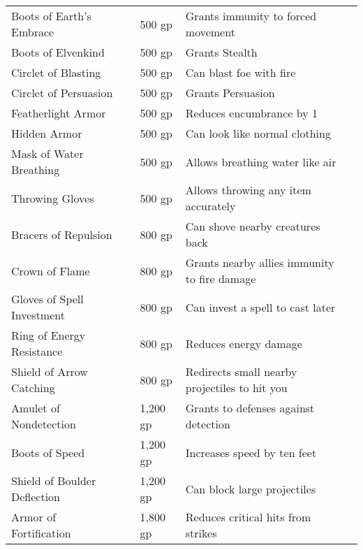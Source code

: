 \begin{longtabuwrapper}
\begin{longtabu}{l l l X l}
Boots of Earth's Embrace &  & 500 gp & Grants immunity to forced movement & \pageref{item:Boots of Earth's Embrace} \\
Boots of Elvenkind &  & 500 gp & Grants  Stealth & \pageref{item:Boots of Elvenkind} \\
Circlet of Blasting &  & 500 gp & Can blast foe with fire & \pageref{item:Circlet of Blasting} \\
Circlet of Persuasion &  & 500 gp & Grants  Persuasion & \pageref{item:Circlet of Persuasion} \\
Featherlight Armor &  & 500 gp & Reduces encumbrance by 1 & \pageref{item:Featherlight Armor} \\
Hidden Armor &  & 500 gp & Can look like normal clothing & \pageref{item:Hidden Armor} \\
Mask of Water Breathing &  & 500 gp & Allows breathing water like air & \pageref{item:Mask of Water Breathing} \\
Throwing Gloves &  & 500 gp & Allows throwing any item accurately & \pageref{item:Throwing Gloves} \\
Bracers of Repulsion &  & 800 gp & Can shove nearby creatures back & \pageref{item:Bracers of Repulsion} \\
Crown of Flame &  & 800 gp & Grants nearby allies immunity to fire damage & \pageref{item:Crown of Flame} \\
Gloves of Spell Investment &  & 800 gp & Can invest a spell to cast later & \pageref{item:Gloves of Spell Investment} \\
Ring of Energy Resistance &  & 800 gp & Reduces energy damage & \pageref{item:Ring of Energy Resistance} \\
Shield of Arrow Catching &  & 800 gp & Redirects small nearby projectiles to hit you & \pageref{item:Shield of Arrow Catching} \\
Amulet of Nondetection &  & 1,200 gp & Grants  to defenses against detection & \pageref{item:Amulet of Nondetection} \\
Boots of Speed &  & 1,200 gp & Increases speed by ten feet & \pageref{item:Boots of Speed} \\
Shield of Boulder Deflection &  & 1,200 gp & Can block large projectiles & \pageref{item:Shield of Boulder Deflection} \\
Armor of Fortification &  & 1,800 gp & Reduces critical hits from strikes & \pageref{item:Armor of Fortification} \\

\end{longtabu}
\end{longtabuwrapper}
